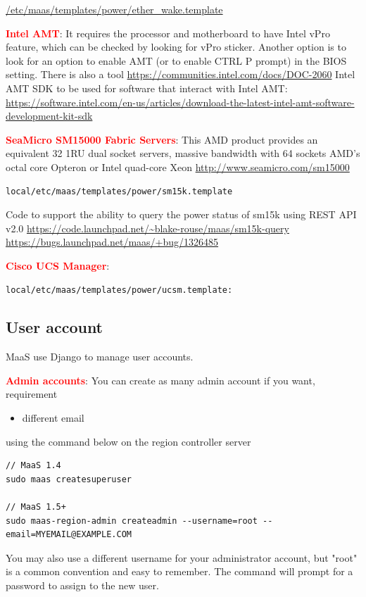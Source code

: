 \url{/etc/maas/templates/power/ether_wake.template}
 
\textcolor{red}{\bf Intel AMT}: It requires the processor and motherboard to
have Intel vPro feature, which can be checked by looking for vPro sticker.
 Another option is to look for an option to enable AMT (or to enable CTRL P
 prompt) in the BIOS setting. There is also a tool
 \url{https://communities.intel.com/docs/DOC-2060}
Intel AMT SDK to be used for software that interact with Intel AMT:
\url{https://software.intel.com/en-us/articles/download-the-latest-intel-amt-software-development-kit-sdk}

\textcolor{red}{\bf SeaMicro SM15000 Fabric Servers}: This AMD product provides
an equivalent 32 1RU dual socket servers, massive bandwidth with 64 sockets
AMD's octal core Opteron or Intel quad-core Xeon
\url{http://www.seamicro.com/sm15000}
\begin{verbatim}
local/etc/maas/templates/power/sm15k.template
\end{verbatim}
Code to support the ability to query the power status of sm15k using REST API
v2.0
\url{https://code.launchpad.net/~blake-rouse/maas/sm15k-query}
\url{https://bugs.launchpad.net/maas/+bug/1326485}


\textcolor{red}{\bf Cisco UCS Manager}: 
\begin{verbatim}
local/etc/maas/templates/power/ucsm.template:
\end{verbatim}

\subsection{User account}
\label{sec:MaaS_user-account}

MaaS use Django to manage user accounts.

\textcolor{red}{\bf Admin accounts}: You can create as many admin account if you
want, requirement
\begin{itemize}
  \item different email
\end{itemize} 
using the command below on the region controller server
\begin{verbatim}
// MaaS 1.4
sudo maas createsuperuser

// MaaS 1.5+
sudo maas-region-admin createadmin --username=root --email=MYEMAIL@EXAMPLE.COM
\end{verbatim}
You may also use a different username for your administrator account, but "root"
is a common convention and easy to remember. The command will prompt for a password to assign to the new user.

